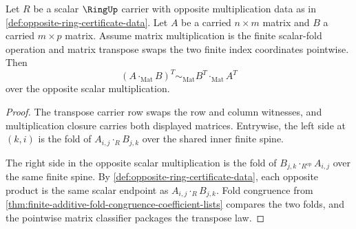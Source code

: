 \begin{theorem}
\label{thm:finite-fold-matrix-transpose-reverses-multiplication}
Let $R$ be a scalar $\RingUp$ carrier with opposite multiplication data as in
\autoref{def:opposite-ring-certificate-data}. Let $A$ be a carried $n\times m$
matrix and $B$ a carried $m\times p$ matrix. Assume matrix multiplication is the
finite scalar-fold operation and matrix transpose swaps the two finite index
coordinates pointwise. Then
$$
(A\cdot_{\mathrm{Mat}}B)^{T}
\sim_{\mathrm{Mat}}
B^{T}\cdot_{\mathrm{Mat}}A^{T}
$$
over the opposite scalar multiplication.
\end{theorem}
\begin{proof}
The transpose carrier row swaps the row and column witnesses, and multiplication
closure carries both displayed matrices. Entrywise, the left side at
$(k,i)$ is the fold of $A_{i,j}\cdot_RB_{j,k}$ over the shared inner finite
spine.

The right side in the opposite scalar multiplication is the fold of
$B_{j,k}\cdot_{R^{\mathrm{op}}}A_{i,j}$ over the same finite spine. By
\autoref{def:opposite-ring-certificate-data}, each opposite product is the same
scalar endpoint as $A_{i,j}\cdot_RB_{j,k}$. Fold congruence from
\autoref{thm:finite-additive-fold-congruence-coefficient-lists} compares the two
folds, and the pointwise matrix classifier packages the transpose law.
\end{proof}

